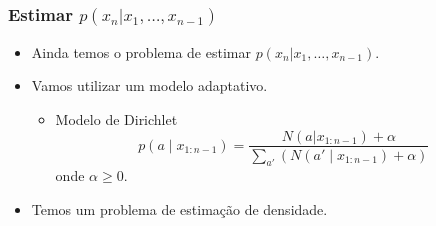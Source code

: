  
\begin{frame}[allowframebreaks]
  \frametitle{Estimar $p(x_n | x_1, \ldots, x_{n-1})$}
  \begin{itemize}
  \item Ainda temos o problema de estimar $p(x_n | x_1, \ldots, x_{n-1})$.
  \item Vamos utilizar um modelo adaptativo.
	\begin{itemize}
	\item Modelo de Dirichlet
		\begin{equation}
		p(a \mid x_{1:n-1}) = \frac{N(a|x_{1:n-1}) + \alpha}{ \sum_{a'} \left( N(a' \mid x_{1:n-1}) + \alpha \right) }
		\end{equation}
		onde $\alpha \geq 0$.
	\end{itemize}
  \item Temos um problema de estimação de densidade.
  \end{itemize}
\end{frame}



